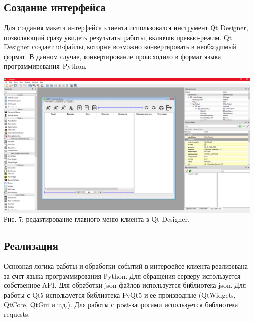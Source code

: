 \documentclass[14pt,a4paper,openbib]{extarticle}
\numberwithin{equation}{section}
\begin{document}
\newpage
\subsection{Создание интерфейса}
Для создания макета интерфейса клиента использовался инструмент Qt Designer, позволяющий сразу увидеть результаты работы, включив превью-режим. Qt Designer создает ui-файлы, которые возможно конвертировать в необходимый формат. В данном случае, конвертирование происходило в формат языка программирования Python.
\begin{center}
\includegraphics[width=\textwidth]{img/qtdesigner.png}\\
Рис. 7: редактирование главного меню клиента в Qt Designer.\\[\baselineskip]
\end{center}


\newpage
\subsection{Реализация}
Основная логика работы и обработки событий в интерфейсе клиента реализована за счет языка программирования Python. Для обращения серверу используется собственное API. Для обработки json файлов используется библиотека json. Для работы с Qt5 используется библиотека PyQt5 и ее производные (QtWidgets, QtCore, QtGui и т.д.). Для работы с post-запросами используется библиотека requests.
\end{document}
